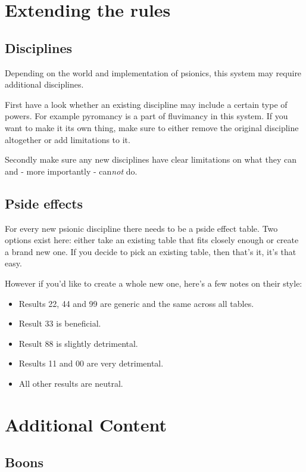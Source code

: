 \documentclass[12pt,a4paper,openany,usenames,dvipsnames]{book}
\begin{document}
	\chapter{Extending the rules}
	\section{Disciplines}
	Depending on the world and implementation of psionics, this system may require additional disciplines.\par
	First have a look whether an existing discipline may include a certain type of powers. For example pyromancy is a part of fluvimancy in this system. If you want to make it its own thing, make sure to either remove the original discipline altogether or add limitations to it.\par
	Secondly make sure any new disciplines have clear limitations on what they can and - more importantly - can\emph{not} do.
	\pagebreak %
	\section{Pside effects}
	For every new psionic discipline there needs to be a pside effect table. Two options exist here: either take an existing table that fits closely enough or create a brand new one. If you decide to pick an existing table, then that's it, it's that easy.\par
	However if you'd like to create a whole new one, here's a few notes on their style:
	\begin{itemize}
		\item Results 22, 44 and 99 are generic and the same across all tables.
		\item Result 33 is beneficial.
		\item Result 88 is slightly detrimental.
		\item Results 11 and 00 are very detrimental.
		\item All other results are neutral.
	\end{itemize}

	\chapter{Additional Content}
	\label{ch:addcontent}
	\section{Boons}
\end{document}
